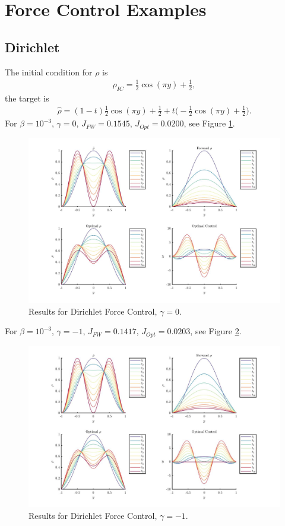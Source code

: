 \documentclass[11pt, a4paper]{article}
\theoremstyle{definition}
\begin{document}
\section{Force Control Examples}

\subsection{Dirichlet}
The initial condition for $\rho$ is 
\begin{align*}
\rho_{IC} = \frac{1}{2}\cos(\pi y) + \frac{1}{2},
\end{align*}
the target is
\begin{align*}
\hat \rho = (1 - t)\frac{1}{2}\cos(\pi y) + \frac{1}{2}  + t\bigg(-\frac{1}{2}\cos(\pi y) + \frac{1}{2}\bigg).
\end{align*}
For $\beta = 10^{-3}$, $\gamma = 0$, $J_{FW} = 0.1545$, $J_{Opt} = 0.0200$, see Figure \ref{ResFD1}.
\begin{figure}[h]
	\includegraphics[scale=0.3]{ResFD1.jpg}
	\caption{Results for Dirichlet Force Control, $\gamma = 0$.}
	\label{ResFD1}
\end{figure}
For $\beta = 10^{-3}$, $\gamma = -1$, $J_{FW} = 0.1417$, $J_{Opt} = 0.0203$, see Figure \ref{ResFD1a}.
\begin{figure}[h]
	\includegraphics[scale=0.3]{ResFD1a.jpg}
	\caption{Results for Dirichlet Force Control, $\gamma = -1$.}
	\label{ResFD1a}
\end{figure}
\end{document}
